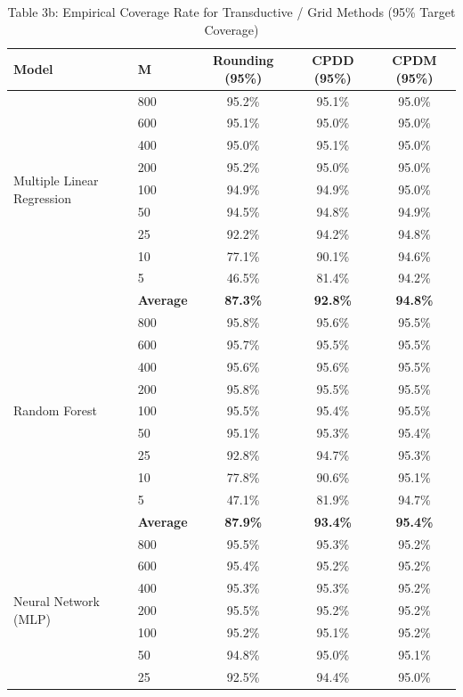 \documentclass[11pt,a4paper]{article}
\begin{document}
\begin{table}[H]
\centering
\caption{Table 3b: Empirical Coverage Rate for Transductive / Grid Methods (95\% Target Coverage)}
\label{tab:mvp_tab3b}
\scriptsize
\begin{tabular}{llccc}
\toprule
Model & M & Rounding (95\%) & CPDD (95\%) & CPDM (95\%) \\
\midrule
\multirow{9}{*}{Multiple Linear Regression}
 & 800 & 95.2\% & 95.1\% & 95.0\% \\
 & 600 & 95.1\% & 95.0\% & 95.0\% \\
 & 400 & 95.0\% & 95.1\% & 95.0\% \\
 & 200 & 95.2\% & 95.0\% & 95.0\% \\
 & 100 & 94.9\% & 94.9\% & 95.0\% \\
 & 50  & 94.5\% & 94.8\% & 94.9\% \\
 & 25  & 92.2\% & 94.2\% & 94.8\% \\
 & 10  & 77.1\% & 90.1\% & 94.6\% \\
 & 5   & 46.5\% & 81.4\% & 94.2\% \\
 & \textbf{Average} & \textbf{87.3\%} & \textbf{92.8\%} & \textbf{94.8\%} \\
\midrule
\multirow{9}{*}{Random Forest}
 & 800 & 95.8\% & 95.6\% & 95.5\% \\
 & 600 & 95.7\% & 95.5\% & 95.5\% \\
 & 400 & 95.6\% & 95.6\% & 95.5\% \\
 & 200 & 95.8\% & 95.5\% & 95.5\% \\
 & 100 & 95.5\% & 95.4\% & 95.5\% \\
 & 50  & 95.1\% & 95.3\% & 95.4\% \\
 & 25  & 92.8\% & 94.7\% & 95.3\% \\
 & 10  & 77.8\% & 90.6\% & 95.1\% \\
 & 5   & 47.1\% & 81.9\% & 94.7\% \\
 & \textbf{Average} & \textbf{87.9\%} & \textbf{93.4\%} & \textbf{95.4\%} \\
\midrule
\multirow{9}{*}{Neural Network (MLP)}
 & 800 & 95.5\% & 95.3\% & 95.2\% \\
 & 600 & 95.4\% & 95.2\% & 95.2\% \\
 & 400 & 95.3\% & 95.3\% & 95.2\% \\
 & 200 & 95.5\% & 95.2\% & 95.2\% \\
 & 100 & 95.2\% & 95.1\% & 95.2\% \\
 & 50  & 94.8\% & 95.0\% & 95.1\% \\
 & 25  & 92.5\% & 94.4\% & 95.0\% \\

\end{tabular}
\end{table}
\end{document}
